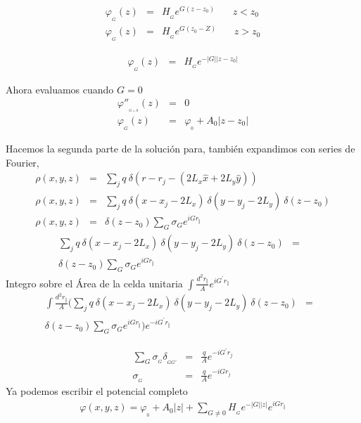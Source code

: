\documentclass[a4paper,11pt,]{book}
\begin{document}
\begin{eqnarray*}
	\varphi_{_{G}}(z)&=& H_{_G}  e^{G (z-z_0)}  \ \ \ \ \ \ \ \ z<z_0 \\
	\varphi_{_{G}}(z)&=& H_{_G} e^{G (z_0-Z)} \ \ \ \ \ \ \ \ z>z_0
\end{eqnarray*}

\begin{eqnarray}
\varphi_{_{G}}(z) &=& H_{_G}  e^{-\vert G \vert \vert z-z_0 \vert}  
\end{eqnarray}

Ahora evaluamos cuando $G=0$
\begin{eqnarray}
\varphi''_{_{_{G=0}}}(z) &=& 0\\
\varphi_{_{G}}(z) &=& \varphi_{_{0}} +A_0 \vert z-z_0 \vert
\end{eqnarray}

Hacemos la segunda parte de la solución para, también expandimos con series de Fourier,
\begin{eqnarray}
\nonumber \rho(x,y,z) &=&  \displaystyle\sum_{j} q  \ \delta (r-r_j-(2L_x \hat{x} +2L_y \hat{y})) \\
\rho(x,y,z) &=& \displaystyle\sum_{j} q  \ \delta (x-x_j-2L_x) \ \delta(y-y_j-2L_y) \ \delta (z-z_0)\\
\nonumber \rho(x,y,z) &=&\delta (z-z_0) \displaystyle\sum_{G} \sigma_{G} e^{i G r_{\Vert}}
\end{eqnarray}
\begin{eqnarray}
\nonumber  \displaystyle\sum_{j} q  \ \delta (x-x_j-2L_x) \ \delta(y-y_j-2L_y) \ \delta (z-z_0) &=&\\\delta (z-z_0) \displaystyle\sum_{G} \sigma_{G} e^{i G r_{\Vert}}
\end{eqnarray}
Integro sobre el Área de la celda unitaria $\int \frac{d^2r_{\Vert}}{A} e^{i G^{'} r_{\Vert}}$
\begin{eqnarray}
\nonumber \int \frac{d^2r_{\Vert}}{A} \Bigg( \displaystyle\sum_{j} q  \ \delta (x-x_j-2L_x) \ \delta(y-y_j-2L_y) \ \delta (z-z_0) &=&\\\delta (z-z_0) \displaystyle\sum_{G} \sigma_{G} e^{i G r_{\Vert}} \Bigg)e^{-i G^{'} r_{\Vert}}
\end{eqnarray}

\begin{eqnarray}
\nonumber  \displaystyle\sum_{G} \sigma_{_{G}} \delta_{_{GG'}} &=&\frac{q}{A} e^{-i G^{'} r_{j}}\\
\sigma_{_{G}}  &=&\frac{q}{A} e^{-i G r_{j}}
\end{eqnarray}
Ya podemos escribir el potencial completo
\begin{eqnarray}
\varphi(x,y,z)= \varphi_{_{0}} +A_0 \vert z \vert + \displaystyle\sum_{G\neq 0} H_{_G}  e^{-\vert G \vert \vert z \vert}  e^{i G r_{\Vert}}
\end{eqnarray}
\end{document}
